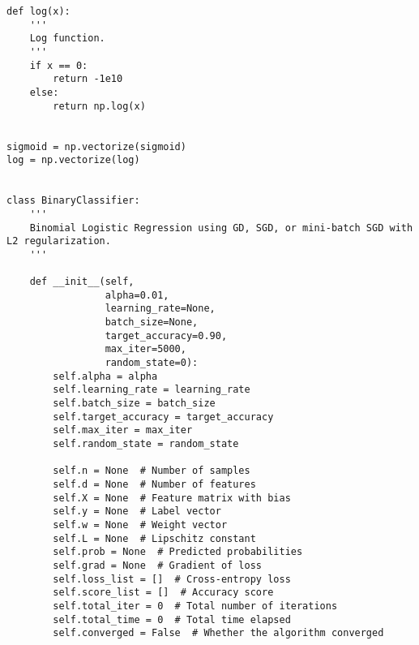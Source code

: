 \begin{verbatim}
def log(x):
    '''
    Log function.
    '''
    if x == 0:
        return -1e10
    else:
        return np.log(x)


sigmoid = np.vectorize(sigmoid)
log = np.vectorize(log)


class BinaryClassifier:
    '''
    Binomial Logistic Regression using GD, SGD, or mini-batch SGD with L2 regularization.
    '''

    def __init__(self,
                 alpha=0.01,
                 learning_rate=None,
                 batch_size=None,
                 target_accuracy=0.90,
                 max_iter=5000,
                 random_state=0):
        self.alpha = alpha
        self.learning_rate = learning_rate
        self.batch_size = batch_size
        self.target_accuracy = target_accuracy
        self.max_iter = max_iter
        self.random_state = random_state

        self.n = None  # Number of samples
        self.d = None  # Number of features
        self.X = None  # Feature matrix with bias
        self.y = None  # Label vector
        self.w = None  # Weight vector
        self.L = None  # Lipschitz constant
        self.prob = None  # Predicted probabilities
        self.grad = None  # Gradient of loss
        self.loss_list = []  # Cross-entropy loss
        self.score_list = []  # Accuracy score
        self.total_iter = 0  # Total number of iterations
        self.total_time = 0  # Total time elapsed
        self.converged = False  # Whether the algorithm converged


\end{verbatim}
